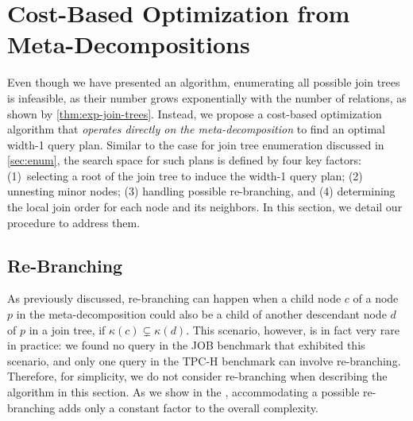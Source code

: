\section{Cost-Based Optimization from Meta-Decompositions}
\label{sec:opt}

Even though we have presented an algorithm, enumerating all possible join trees is infeasible, as their number grows exponentially with the number of relations, as shown by \cref{thm:exp-join-trees}. Instead, we propose a cost-based optimization algorithm that \emph{operates directly on the meta-decomposition} to find an optimal width-1 query plan.  
Similar to the case for join tree enumeration discussed in \cref{sec:enum}, the search space for such plans is defined by four key factors: (1)~selecting a root of the join tree to induce the width-1 query plan; (2) unnesting minor nodes; (3) handling possible re-branching, and (4) determining the local join order for each node and its neighbors.  In this section, we detail our procedure to address them.  

\subsection{Re-Branching}

As previously discussed, re-branching can happen when a child node $c$ of a node $p$ in the meta-decomposition could also be a child of another descendant node $d$ of $p$ in a join tree, if $\kappa(c) \subsetneq \kappa(d)$.
This scenario, however, is in fact very rare in practice: we found no query in the JOB benchmark that exhibited this scenario, and only one query in the TPC-H benchmark can involve re-branching.
Therefore, for simplicity, we do not consider re-branching when describing the algorithm in this section. 
As we show in the \arxivorappendix, accommodating a possible re-branching adds only a constant factor to the overall complexity.

